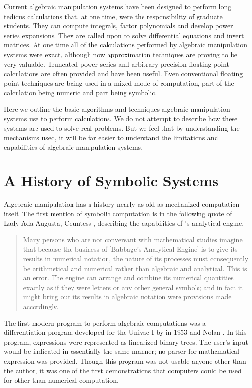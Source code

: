 Current algebraic manipulation systems have been designed to perform long
tedious calculations that, at one time, were the responsibility of graduate
students.  They can compute integrals, factor polynomials and develop power
series expansions.  They are called upon to solve differential equations
and invert matrices.  At one time all of the calculations performed by
algebraic manipulation systems were exact, although now approximation
techniques are proving to be very valuable.  Truncated power series and
arbitrary precision floating point calculations are often provided and have
been useful.  Even conventional floating point techniques are being used in
a mixed mode of computation, part of the calculation being numeric and part
being symbolic.

\medskip

Here we outline the basic algorithms and techniques algebraic manipulation
systems use to perform calculations.  We do not attempt to describe how
these systems are used to solve real problems.  But we feel that by
understanding the mechanisms used, it will be far easier to understand the
limitations and capabilities of algebraic manipulation systems.

\section{A History of Symbolic Systems}

Algebraic manipulation has a history nearly as old as mechanized
computation itself.  The first mention of symbolic computation is in
the following quote of Lady Ada Augusta, Countess {\Lovelace},
describing the capabilities of {\Babbage}'s analytical engine.

\begin{quotation}
Many persons who are not conversant with mathematical studies imagine that
because the business of [Babbage's Analytical Engine] is to give its
results in numerical notation, the nature of its processes must
consequently be arithmetical and numerical rather than algebraic and
analytical.  This is an error.  The engine can arrange and combine its
numerical quantities exactly as if they were letters or any other general
symbols; and in fact it might bring out its results in algebraic notation
were provisions made accordingly.
\end{quotation}

The first modern program to perform algebraic computations was a
differentiation program developed for the Univac I by {\Kahrimanian}in
1953 \cite{Kahrimanian1953-gs} and {Nolan} \cite{Nolan1953-te}.  
In this program, expressions were
represented as linearized binary trees.  The user's input would be
indicated in essentially the same manner; no parser for mathematical
expression was provided.  Though this program was not usable anyone
other than the author, it was one of the first demonstrations that
computers could be used for other than numerical computation.


